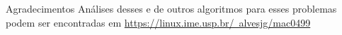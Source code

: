 \documentclass[final]{beamer}
\begin{document}
\begin{frame}[t]
\begin{columns}[t]
\begin{column}{0.48\paperwidth}
\begin{block}{Agradecimentos}
      Análises desses e de outros algoritmos para esses problemas podem ser encontradas em \href{https://linux.ime.usp.br/~alvesjg/mac0499/}{https://linux.ime.usp.br/~alvesjg/mac0499}
      
    \end{block}
  \end{column}
\end{columns}

\end{frame}
\end{document}
